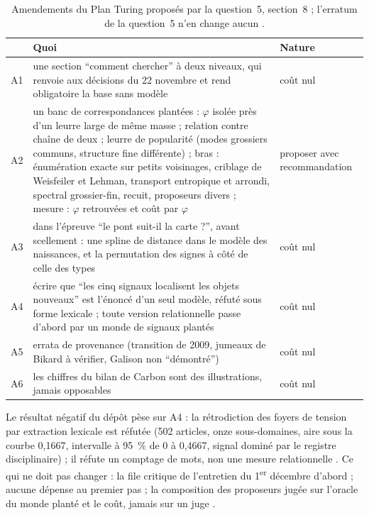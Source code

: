 \documentclass[11pt,a4paper]{article}
\theoremstyle{definition}
\theoremstyle{plain}
\begin{document}
\begin{table}[ht]
\centering\small
\caption{Amendements du Plan Turing proposés par la question~5, section~8 \cite{q5} ; l'erratum de
la question~5 n'en change aucun \cite{erratumq5}.}
\label{tab:amendements}
\begin{tabularx}{\textwidth}{@{}lXl@{}}
\toprule
 & Quoi & Nature \\
\midrule
A1 & une section \enquote{comment chercher} à deux niveaux, qui renvoie aux décisions du 22 novembre et rend obligatoire la base sans modèle & coût nul \\
A2 & un banc de correspondances plantées : $\varphi$ isolée près d'un leurre large de même masse ; relation contre chaîne de deux ; leurre de popularité (modes grossiers communs, structure fine différente) ; bras : énumération exacte sur petits voisinages, criblage de Weisfeiler et Lehman, transport entropique et arrondi, spectral grossier-fin, recuit, proposeurs divers ; mesure : $\varphi$ retrouvées et coût par $\varphi$ & proposer avec recommandation \\
A3 & dans l'épreuve \enquote{le pont suit-il la carte ?}, avant scellement : une spline de distance dans le modèle des naissances, et la permutation des signes à côté de celle des types & coût nul \\
A4 & écrire que \enquote{les cinq signaux localisent les objets nouveaux} est l'énoncé d'un seul modèle, réfuté sous forme lexicale ; toute version relationnelle passe d'abord par un monde de signaux plantés & coût nul \\
A5 & errata de provenance (transition de 2009, jumeaux de Bikard à vérifier, Galison non \enquote{démontré}) & coût nul \\
A6 & les chiffres du bilan de Carbon sont des illustrations, jamais opposables & coût nul \\
\bottomrule
\end{tabularx}
\end{table}

Le résultat négatif du dépôt pèse sur A4 : la rétrodiction des foyers de tension par extraction
lexicale est réfutée (502 articles, onze sous-domaines, aire sous la courbe 0,1667, intervalle à
95~\% de 0 à 0,4667, signal dominé par le registre disciplinaire) ; il réfute un comptage de mots, non
une mesure relationnelle \cite[question~8, point (1)]{reformq8}. Ce qui ne doit pas changer : la file
critique de l'entretien du 1\textsuperscript{er} décembre d'abord ; aucune dépense au premier pas ;
la composition des proposeurs jugée sur l'oracle du monde planté et le coût, jamais sur un juge
\cite[section~8]{q5}.
\end{document}
